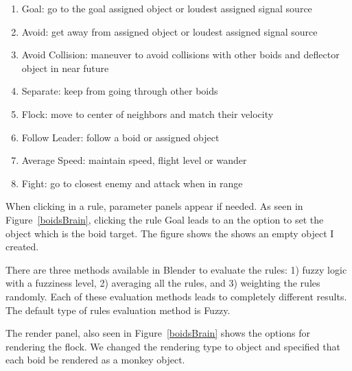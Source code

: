 \begin{enumerate}
\item{Goal: go to the goal assigned object or loudest assigned signal source}
\item{Avoid: get away from assigned object or loudest assigned signal source}
\item{Avoid Collision: maneuver to avoid collisions with other boids and deflector object in near future}
\item{Separate: keep from going through other boids}
\item{Flock: move to center of neighbors and match their velocity}
\item{Follow Leader: follow a boid or assigned object}
\item{Average Speed: maintain speed, flight level or wander}
\item{Fight: go to closest enemy and attack when in range}
\end{enumerate}

When clicking in a rule, parameter panels appear if needed. 
As seen in Figure~\ref{boidsBrain}, clicking the rule Goal leads to an the option to set the object which is the boid target. The figure shows the shows an empty object I created. 

There are three methods available in Blender to evaluate the rules: 1) fuzzy logic with a fuzziness level, 2) averaging all the rules, and 3) weighting the rules randomly. Each of these evaluation methods leads to completely different results. The default type of rules evaluation method is Fuzzy.

The render panel, also seen in Figure~\ref{boidsBrain} shows the options for rendering the flock. We changed the rendering type to object and specified that each boid be rendered as a monkey object.

